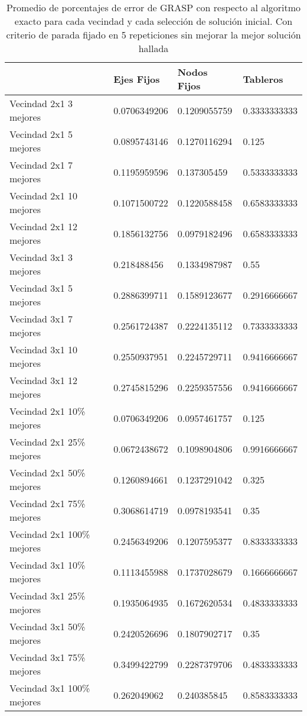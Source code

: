 \begin{table}[h!]
	\begin{tabular}[c]{|l|l|l|l|}
	\hline  & Ejes Fijos & Nodos Fijos & Tableros \\
	\hline Vecindad 2x1 3 mejores & 0.0706349206 & 0.1209055759 & 0.3333333333 \\
	\hline Vecindad 2x1 5 mejores & 0.0895743146 & 0.1270116294 & 0.125 \\
	\hline Vecindad 2x1 7 mejores & 0.1195959596 & 0.137305459 & 0.5333333333 \\
	\hline Vecindad 2x1 10 mejores & 0.1071500722 & 0.1220588458 & 0.6583333333 \\
	\hline Vecindad 2x1 12 mejores & 0.1856132756 & 0.0979182496 & 0.6583333333 \\
	\hline Vecindad 3x1 3 mejores & 0.218488456 & 0.1334987987 & 0.55 \\
	\hline Vecindad 3x1 5 mejores & 0.2886399711 & 0.1589123677 & 0.2916666667 \\
	\hline Vecindad 3x1 7 mejores & 0.2561724387 & 0.2224135112 & 0.7333333333 \\
	\hline Vecindad 3x1 10 mejores & 0.2550937951 & 0.2245729711 & 0.9416666667 \\
	\hline Vecindad 3x1 12 mejores & 0.2745815296 & 0.2259357556 & 0.9416666667 \\
	\hline Vecindad 2x1 10\% mejores & 0.0706349206 & 0.0957461757 & 0.125 \\
	\hline Vecindad 2x1 25\% mejores & 0.0672438672 & 0.1098904806 & 0.9916666667 \\
	\hline Vecindad 2x1 50\% mejores & 0.1260894661 & 0.1237291042 & 0.325 \\
	\hline Vecindad 2x1 75\% mejores & 0.3068614719 & 0.0978193541 & 0.35 \\
	\hline Vecindad 2x1 100\% mejores & 0.2456349206 & 0.1207595377 & 0.8333333333 \\
	\hline Vecindad 3x1 10\% mejores & 0.1113455988 & 0.1737028679 & 0.1666666667 \\
	\hline Vecindad 3x1 25\% mejores & 0.1935064935 & 0.1672620534 & 0.4833333333 \\
	\hline Vecindad 3x1 50\% mejores & 0.2420526696 & 0.1807902717 & 0.35 \\
	\hline Vecindad 3x1 75\% mejores & 0.3499422799 & 0.2287379706 & 0.4833333333 \\
	\hline Vecindad 3x1 100\% mejores & 0.262049062 & 0.240385845 & 0.8583333333 \\
	\hline
	\end{tabular}
\caption{Promedio de porcentajes de error de GRASP con respecto al algoritmo exacto para cada vecindad y cada selecci\'on de soluci\'on inicial. Con criterio de parada fijado en 5 repeticiones sin mejorar la mejor soluci\'on hallada}
\end{table}
 
